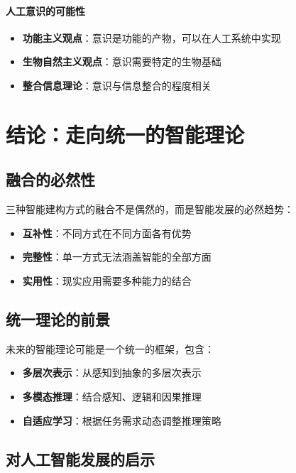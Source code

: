 \paragraph{人工意识的可能性}
\begin{itemize}
\item \textbf{功能主义观点}：意识是功能的产物，可以在人工系统中实现
\item \textbf{生物自然主义观点}：意识需要特定的生物基础
\item \textbf{整合信息理论}：意识与信息整合的程度相关
\end{itemize}

\section{结论：走向统一的智能理论}

\subsection{融合的必然性}

三种智能建构方式的融合不是偶然的，而是智能发展的必然趋势：

\begin{itemize}
\item \textbf{互补性}：不同方式在不同方面各有优势
\item \textbf{完整性}：单一方式无法涵盖智能的全部方面
\item \textbf{实用性}：现实应用需要多种能力的结合
\end{itemize}

\subsection{统一理论的前景}

未来的智能理论可能是一个统一的框架，包含：

\begin{itemize}
\item \textbf{多层次表示}：从感知到抽象的多层次表示
\item \textbf{多模态推理}：结合感知、逻辑和因果推理
\item \textbf{自适应学习}：根据任务需求动态调整推理策略
\end{itemize}

\subsection{对人工智能发展的启示}

